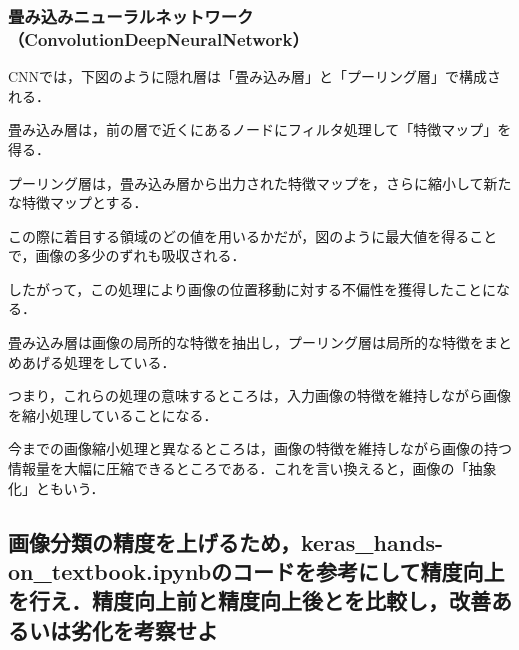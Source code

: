 \documentclass[uplatex,titlepage]{jsarticle}
\newif\iffigure
\begin{document}
\subsubsection{畳み込みニューラルネットワーク（ConvolutionDeepNeuralNetwork）}
CNNでは，下図のように隠れ層は「畳み込み層」と「プーリング層」で構成される．\par
畳み込み層は，前の層で近くにあるノードにフィルタ処理して「特徴マップ」を得る．\par
プーリング層は，畳み込み層から出力された特徴マップを，さらに縮小して新たな特徴マップとする．\par
この際に着目する領域のどの値を用いるかだが，図のように最大値を得ることで，画像の多少のずれも吸収される．\par
したがって，この処理により画像の位置移動に対する不偏性を獲得したことになる．
\iffigure
\begin{figure}[H]%
    \begin{center}
    \texttt{[image: CNN\_model.png]} 
    \caption{畳み込みニューラルネットワーク}
    \end{center}
\end{figure}
\fi
畳み込み層は画像の局所的な特徴を抽出し，プーリング層は局所的な特徴をまとめあげる処理をしている．\par
つまり，これらの処理の意味するところは，入力画像の特徴を維持しながら画像を縮小処理していることになる．\par
今までの画像縮小処理と異なるところは，画像の特徴を維持しながら画像の持つ情報量を大幅に圧縮できるところである．これを言い換えると，画像の「抽象化」ともいう．

\iffigure
\begin{figure}[H]%
    \begin{center}
    \texttt{[image: CNN\_model2.png]} 
    \caption{畳み込みニューラルネットワーク2}
    \end{center}
\end{figure}
\fi

\subsection{画像分類の精度を上げるため，keras\_hands-on\_textbook.ipynbのコードを参考にして精度向上を行え．精度向上前と精度向上後とを比較し，改善あるいは劣化を考察せよ}
\end{document}
